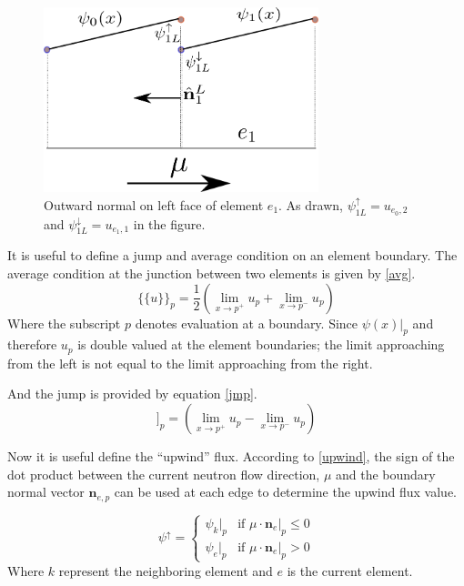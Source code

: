 \begin{figure}[!htbp]
\centering
\includegraphics[width=8cm]{images/bound_norm.png}
\caption{Outward normal on left face of element $e_1$. As drawn, $\psi_{1L}^{\uparrow}=u_{e_0, 2}$ and $\psi_{1L}^{\downarrow}=u_{e_1, 1}$ in the figure.}
\label{bound_norm}
\end{figure}

It is useful to define a jump and average condition on an element boundary.
The average condition at the junction between two elements is given by \ref{avg}.
\begin{equation}
\{\{u\}\}_p = \frac{1}{2} (\lim_{x \to p^+} u_{p} + \lim_{x \to p^-} u_{p})
\label{avg}
\end{equation}
Where the subscript $p$ denotes evaluation at a boundary. Since $\psi(x)|_p$ and therefore $u_p$ is double valued at the element boundaries; the limit approaching from the left is not equal to the limit approaching from the right.

And the jump is provided by equation \ref{jmp}.
\begin{equation}
[[u]]_p =  (\lim_{x \to p^+} u_{p} - \lim_{x \to p^-} u_{p})
\label{jmp}
\end{equation}

Now it is useful define the ``upwind'' flux.  According to \ref{upwind}, the sign of the dot product between the current neutron flow direction, $\mu$ and the boundary normal vector $\mathbf n_{e,p}$ can be used at each edge to determine the upwind flux value.

\begin{equation}
\psi^{\uparrow} = 
  \begin{cases}
      \psi_k|_p & \text{if $\mu \cdot \mathbf n_e|_p \leq 0$} \\
      \psi_e|_p & \text{if $\mu \cdot \mathbf n_e|_p > 0$} 
  \end{cases}
\label{upwind}
\end{equation}
Where $k$ represent the neighboring element and $e$ is the current element.

